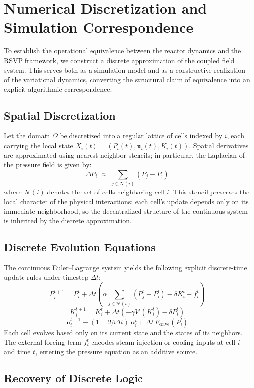 \documentclass[12pt, a4paper]{article}
\begin{document}
\section{Numerical Discretization and Simulation Correspondence}

To establish the operational equivalence between the reactor dynamics and the RSVP framework, we construct a discrete approximation of the coupled field system. This serves both as a simulation model and as a constructive realization of the variational dynamics, converting the structural claim of equivalence into an explicit algorithmic correspondence.

\subsection{Spatial Discretization}

Let the domain $\Omega$ be discretized into a regular lattice of cells indexed by $i$, each carrying the local state $X_i(t) = (P_i(t), \mathbf{u}_i(t), K_i(t))$. Spatial derivatives are approximated using nearest-neighbor stencils; in particular, the Laplacian of the pressure field is given by:
\[
\Delta P_i \;\approx\; \sum_{j \in \mathcal{N}(i)} (P_j - P_i)
\]
where $\mathcal{N}(i)$ denotes the set of cells neighboring cell $i$. This stencil preserves the local character of the physical interactions: each cell's update depends only on its immediate neighborhood, so the decentralized structure of the continuous system is inherited by the discrete approximation.

\subsection{Discrete Evolution Equations}

The continuous Euler--Lagrange system yields the following explicit discrete-time update rules under timestep $\Delta t$:
\[
P_i^{t+1} = P_i^t + \Delta t \left( \alpha \sum_{j \in \mathcal{N}(i)} (P_j^t - P_i^t) - \delta K_i^t + f_i^t \right)
\]
\[
K_i^{t+1} = K_i^t + \Delta t \left( -\gamma V'(K_i^t) - \delta P_i^t \right)
\]
\[
\mathbf{u}_i^{t+1} = (1 - 2\beta \Delta t)\, \mathbf{u}_i^t + \Delta t\, F_{\text{drive}}(P_i^t)
\]
Each cell evolves based only on its current state and the states of its neighbors. The external forcing term $f_i^t$ encodes steam injection or cooling inputs at cell $i$ and time $t$, entering the pressure equation as an additive source.

\subsection{Recovery of Discrete Logic}
\end{document}
